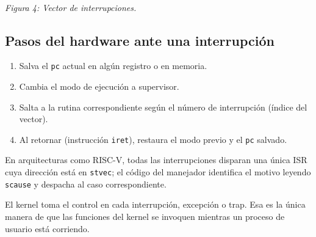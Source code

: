 \documentclass[11pt,a4paper]{article}
\begin{document}
\begin{center}
\\
\small\emph{Figura 4: Vector de interrupciones.}
\end{center}

\subsection{Pasos del hardware ante una interrupción}

\begin{enumerate}[leftmargin=*,nosep]
    \item Salva el \texttt{pc} actual en algún registro o en memoria.
    \item Cambia el modo de ejecución a supervisor.
    \item Salta a la rutina correspondiente según el número de
        interrupción (índice del vector).
    \item Al retornar (instrucción \texttt{iret}), restaura el modo
        previo y el \texttt{pc} salvado.
\end{enumerate}

En arquitecturas como RISC-V, todas las interrupciones disparan una
única ISR cuya dirección está en \texttt{stvec}; el código del
manejador identifica el motivo leyendo \texttt{scause} y despacha al
caso correspondiente.

\begin{importante}
El kernel toma el control en cada interrupción, excepción o trap.
Esa es la única manera de que las funciones del kernel se invoquen
mientras un proceso de usuario está corriendo.
\end{importante}
\end{document}
